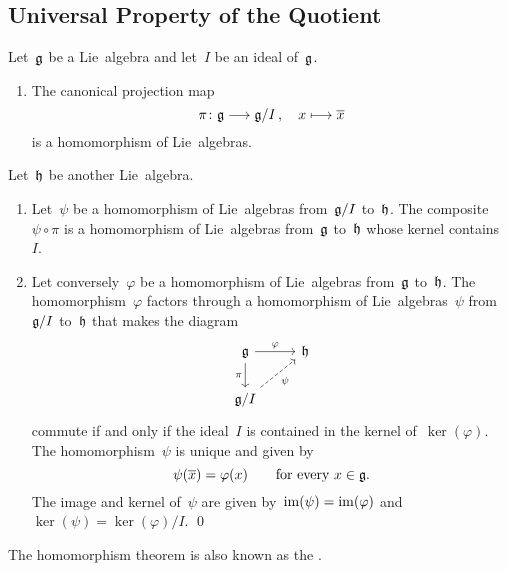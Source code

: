 \subsection{Universal Property of the Quotient}


\begin{theorem}
	\label{homomorphism theorem}
	Let~$\mathfrak{g}$ be a Lie~algebra and let~$I$ be an ideal of~$\mathfrak{g}$.
	\begin{enumerate}
		\item
			The canonical projection map
			\[
				\pi
				\colon
				\glie
				\to
				\glie/I \,,
				\quad
				x
				\mapsto
				\class{x}
			\]
			is a homomorphism of Lie~algebras.
	\end{enumerate}
	Let~$\mathfrak{h}$ be another Lie~algebra.
	\begin{enumerate}[resume*]
		\item
			Let~$\psi$ be a homomorphism of Lie~algebras from~$\mathfrak{g}/I$ to~$\mathfrak{h}$.
			The composite~$\psi \circ \pi$ is a homomorphism of Lie~algebras from~$\mathfrak{g}$ to~$\mathfrak{h}$ whose kernel contains~$I$.
		\item
			Let conversely~$\varphi$ be a homomorphism of Lie~algebras from~$\mathfrak{g}$ to~$\mathfrak{h}$.
			The homomorphism~$\varphi$ factors through a homomorphism of Lie~algebras~$\psi$ from~$\mathfrak{g}/I$ to~$\mathfrak{h}$ that makes the diagram
			\[
				\begin{tikzcd}
					\glie
					\arrow{r}[above]{\varphi}
					\arrow{d}[left]{\pi}
					&
					\hlie
					\\
					\glie/I
					\arrow[dashed]{ur}[below right]{\psi}
					&
					{}
				\end{tikzcd}
			\]
			commute if and only if the ideal~$I$ is contained in the kernel of~$\ker(\varphi)$.
			The homomorphism~$\psi$ is unique and given by
			\[
				\psi( \overline{x} )
				=
				\varphi(x)
				\qquad
				\text{for every~$x \in \mathfrak{g}$.}
			\]
			The image and kernel of~$\psi$ are given by~$\operatorname{im}(\psi) = \operatorname{im}(\varphi)$ and~$\ker(\psi) = \ker(\varphi)/I$.
		\qed
	\end{enumerate}
\end{theorem}




\begin{remark}
	The homomorphism theorem is also known as the .
\end{remark}



